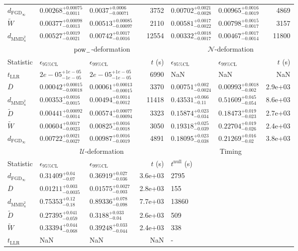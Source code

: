 \begin{tabular}{l|llr|llr}
	$d_{\mathrm{FGD}_{\infty}}$ & $0.00268_{-0.0011}^{+0.00075}$ & $0.0037_{-0.00071}^{+0.0006}$ & 3752 & $0.00702_{-0.0028}^{+0.0021}$ & $0.00965_{-0.0019}^{+0.0016}$ & 4869 \\
	$\widetilde{W}$ & $0.00377_{-0.0013}^{+0.00098}$ & $0.00513_{-0.00097}^{+0.00085}$ & 2110 & $0.00581_{-0.0022}^{+0.0017}$ & $0.00798_{-0.0017}^{+0.0015}$ & 3157 \\
	$d_{\mathrm{MMD}^{2}_{u}}$ & $0.00527_{-0.0021}^{+0.0019}$ & $0.00742_{-0.0016}^{+0.0017}$ & 12554 & $0.00332_{-0.0017}^{+0.0018}$ & $0.00467_{-0.0014}^{+0.0017}$ & 11800 \\
	\toprule
	\multicolumn{1}{c}{} & \multicolumn{3}{c}{$\rm{pow}_{-}$-deformation} & \multicolumn{3}{c}{$\mathcal{N}$-deformation} \\
	Statistic & $\epsilon_{95\%\mathrm{CL}}$ & $\epsilon_{99\%\mathrm{CL}}$ & $t$ (s) & $\epsilon_{95\%\mathrm{CL}}$ & $\epsilon_{99\%\mathrm{CL}}$ & $t$ (s) \\
	\midrule
	$t_{\mathrm{LLR}}$ & $2e-05_{-1e-05}^{+1e-05}$ & $2e-05_{-1e-05}^{+1e-05}$ & 6990 & NaN & NaN & NaN \\
	$\overline{D}$ & $0.00042_{-0.00018}^{+0.00015}$ & $0.00061_{-0.00015}^{+0.00013}$ & 3370 & $0.00751_{-0.0024}^{+0.002}$ & $0.00993_{-0.002}^{+0.0018}$ & 2.9e+03 \\
	$d_{\mathrm{MMD}^{2}_{u}}$ & $0.00353_{-0.0015}^{+0.0016}$ & $0.00494_{-0.0012}^{+0.0014}$ & 11418 & $0.43531_{-0.11}^{+0.066}$ & $0.51609_{-0.054}^{+0.045}$ & 8.6e+03 \\
	$\widetilde{D}$ & $0.00441_{-0.0014}^{+0.00092}$ & $0.00574_{-0.00094}^{+0.00077}$ & 3323 & $0.15874_{-0.034}^{+0.023}$ & $0.18473_{-0.023}^{+0.019}$ & 2.7e+03 \\
	$\widetilde{W}$ & $0.00604_{-0.0023}^{+0.0017}$ & $0.00825_{-0.0018}^{+0.0016}$ & 3050 & $0.19318_{-0.039}^{+0.025}$ & $0.22704_{-0.026}^{+0.019}$ & 2.4e+03 \\
	$d_{\mathrm{FGD}_{\infty}}$ & $0.00722_{-0.0027}^{+0.0021}$ & $0.00987_{-0.0019}^{+0.0016}$ & 4891 & $0.18095_{-0.038}^{+0.023}$ & $0.21269_{-0.02}^{+0.016}$ & 3.8e+03 \\
	\toprule
	\multicolumn{1}{c}{} & \multicolumn{3}{c}{$\mathcal{U}$-deformation} & \multicolumn{3}{c}{Timing} \\
	Statistic & $\epsilon_{95\%\mathrm{CL}}$ & $\epsilon_{99\%\mathrm{CL}}$ & $t$ (s) & $t^{\mathrm{null}}$ (s) \\
	\midrule
	$d_{\mathrm{FGD}_{\infty}}$ & $0.31409_{-0.07}^{+0.04}$ & $0.36919_{-0.036}^{+0.027}$ & 3.6e+03 & 2795 \\
	$\overline{D}$ & $0.01211_{-0.0035}^{+0.003}$ & $0.01575_{-0.003}^{+0.0027}$ & 2.8e+03 & 155 \\
	$d_{\mathrm{MMD}^{2}_{u}}$ & $0.75353_{-0.18}^{+0.12}$ & $0.89336_{-0.098}^{+0.078}$ & 7.7e+03 & 13860 \\
	$\widetilde{D}$ & $0.27395_{-0.059}^{+0.041}$ & $0.3188_{-0.04}^{+0.033}$ & 2.6e+03 & 509 \\
	$\widetilde{W}$ & $0.33394_{-0.068}^{+0.044}$ & $0.39248_{-0.044}^{+0.033}$ & 2.4e+03 & 338 \\
	$t_{\mathrm{LLR}}$ & NaN & NaN & NaN & - \\
	\bottomrule
\end{tabular}